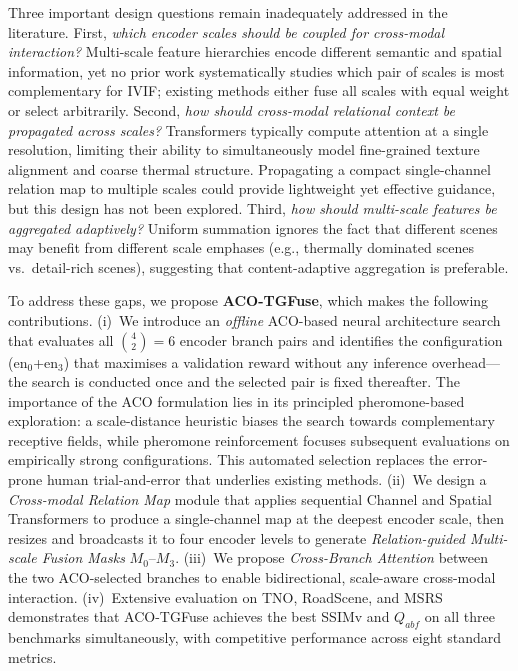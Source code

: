 \documentclass[a4paper,fleqn]{cas-dc}
\begin{document}
Three important design questions remain inadequately addressed in the
literature.  First, \emph{which encoder scales should be coupled for
cross-modal interaction?}  Multi-scale feature hierarchies encode different
semantic and spatial information, yet no prior work systematically studies
which pair of scales is most complementary for IVIF; existing methods either
fuse all scales with equal weight or select arbitrarily.  Second,
\emph{how should cross-modal relational context be propagated across scales?}
Transformers typically compute attention at a single resolution, limiting
their ability to simultaneously model fine-grained texture alignment and
coarse thermal structure.  Propagating a compact single-channel relation map
to multiple scales could provide lightweight yet effective guidance, but this
design has not been explored.  Third, \emph{how should multi-scale features
be aggregated adaptively?}  Uniform summation ignores the fact that different
scenes may benefit from different scale emphases (e.g., thermally dominated
scenes vs.\ detail-rich scenes), suggesting that content-adaptive aggregation
is preferable.

To address these gaps, we propose \textbf{ACO-TGFuse}, which makes the
following contributions.  (i)~We introduce an \emph{offline} ACO-based neural
architecture search that evaluates all $\binom{4}{2}=6$ encoder branch pairs
and identifies the configuration ($\mathrm{en}_0$+$\mathrm{en}_3$) that
maximises a validation reward without any inference overhead---the search is
conducted once and the selected pair is fixed thereafter.  The importance of
the ACO formulation lies in its principled pheromone-based exploration: a
scale-distance heuristic biases the search towards complementary receptive
fields, while pheromone reinforcement focuses subsequent evaluations on
empirically strong configurations.  This automated selection replaces
the error-prone human trial-and-error that underlies existing methods.
(ii)~We design a \emph{Cross-modal Relation Map} module that applies
sequential Channel and Spatial Transformers to produce a single-channel map
at the deepest encoder scale, then resizes and broadcasts it to four
encoder levels to generate \emph{Relation-guided Multi-scale Fusion Masks}
$M_0$--$M_3$.  (iii)~We propose \emph{Cross-Branch Attention} between the
two ACO-selected branches to enable bidirectional, scale-aware cross-modal
interaction.  (iv)~Extensive evaluation on TNO, RoadScene, and MSRS
demonstrates that ACO-TGFuse achieves the best SSIMv and $Q_{abf}$ on all
three benchmarks simultaneously, with competitive performance across eight
standard metrics.
\end{document}
